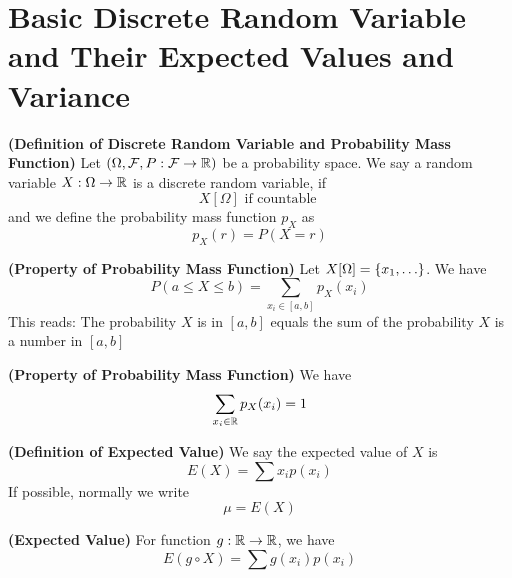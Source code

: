 \documentclass{report}
\begin{document}
\section{Basic Discrete Random Variable and Their Expected Values and Variance}
\begin{definition}
\label{2.1.1}
\textbf{(Definition of Discrete Random Variable and Probability Mass Function)} Let $(\Omega,\mathcal{F},P:\mathcal{F}\rightarrow \mathbb{R})$ be a probability space. We say a random variable $X:\Omega\rightarrow \mathbb{R} $ is a discrete random variable, if 
\begin{equation}
  X[\Omega]\text{ if countable }
\end{equation}
and we define the probability mass function $p_X$ as
\begin{equation}
p_X(r)=P(X=r)
\end{equation}
\end{definition}
\begin{theorem}
\label{2.1.2}
\textbf{(Property of Probability Mass Function)} Let $X[\Omega]=\set{x_1, \dots }$. We have
\begin{equation}
P(a\leq X\leq b)=\sum_{x_i\in [a,b]}p_X(x_i)
\end{equation}
This reads: The probability $X$ is in  $[a,b]$ equals the sum of the probability $X$ is a number in  $[a,b]$
\end{theorem}
\begin{theorem}
\label{2.1.3}
\textbf{(Property of Probability Mass Function)} We have
\begin{equation}
\sum_{x_i \in \mathbb{R}} p_X(x_i)=1
\end{equation}
\end{theorem}
\begin{definition}
\label{2.1.4}
\textbf{(Definition of Expected Value)} We say the expected value of $X$ is 
 \begin{equation}
E(X)=\sum x_ip(x_i)
\end{equation}
If possible, normally we write
\begin{equation}
\mu = E(X)
\end{equation}
\end{definition}
\begin{theorem}
\label{2.1.5}
\textbf{(Expected Value)} For function $g:\mathbb{R}\rightarrow \mathbb{R}$, we have
\begin{equation}
E(g\circ X)=\sum g(x_i)p(x_i)
\end{equation}
\end{theorem}
\end{document}
